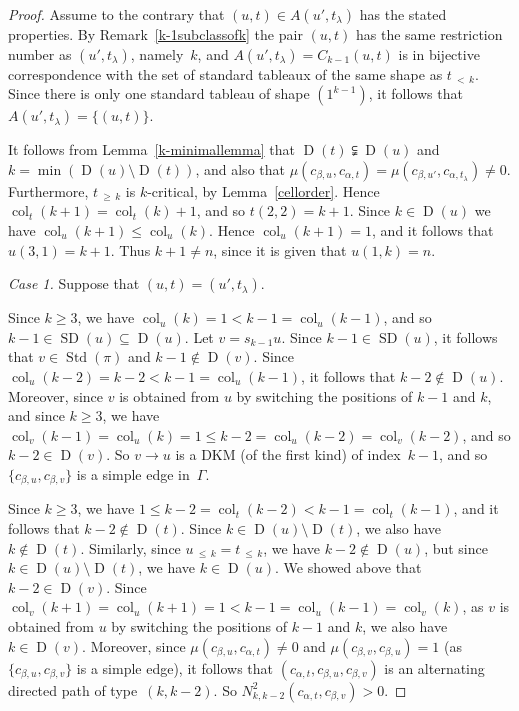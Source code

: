 \documentclass[10pt]{amsart}
\theoremstyle{definition}
\newenvironment{Case}[1]{\smallskip\noindent\emph{Case #1}\endgraf
 \nobreak\noindent\ignorespaces}{\endgraf\smallskip}
\DeclareMathOperator{\col}{col}
\newcommand{\lessthan}[2]{#1\,{_{<\,#2}}}
\newcommand{\Lessthan}[2]{#1\,{_{\leqslant\,#2}}}
\newcommand{\Morethan}[2]{#1\,{_{\geqslant\,#2}}}
\DeclareMathOperator{\STD}{Std}
\DeclareMathOperator{\SD}{SD}
\DeclareMathOperator{\D}{D}
\begin{document}
\begin{proof}
Assume to the contrary that $(u,t)\in A(u',t_\lambda)$ has the stated properties.
By Remark~\ref{k-1subclassofk} the pair $(u,t)$ has the same restriction number
as $(u',t_\lambda)$, namely~$k$, and $A(u',t_\lambda)=C_{k-1}(u,t)$ is in bijective
correspondence with the set of standard tableaux of the same shape as $\lessthan tk$.
Since there is only one standard tableau of shape $(1^{k-1})$, it follows that
$A(u',t_\lambda)=\{(u,t)\}$.

It follows from Lemma~\ref{k-minimallemma} that $\D(t)\subsetneqq\D(u)$ and
$k=\min(\D(u)\setminus\D(t))$, and also that
$\mu(c_{\beta,u},c_{\alpha,t})=\mu(c_{\beta,u'},c_{\alpha,t_\lambda})\neq 0$. Furthermore,
$\Morethan tk$ is $k$-critical, by Lemma~\ref{cellorder}.
Hence $\col_t(k+1)=\col_t(k)+1$, and so $t(2,2)=k+1$. Since
$k\in\D(u)$ we have $\col_u(k+1)\leqslant\col_u(k)$. Hence $\col_u(k+1)=1$,
and it follows that $u(3,1)=k+1$. Thus $k+1\ne n$, since it is given that
$u(1,k)=n$.

\begin{Case}{1.} Suppose that $(u,t)=(u',t_\lambda)$.

Since $k\geqslant 3$, we have
$\col_u(k)=1<k-1=\col_u(k-1)$, and so
$k-1\in\SD(u)\subseteq\D(u)$. Let $v=s_{k-1}u$. Since
$k-1\in\SD(u)$, it follows that
$v\in\STD(\pi)$ and $k-1\notin\D(v)$.
Since $\col_u(k-2)=k-2<k-1=\col_u(k-1)$, it follows that
$k-2\notin\D(u)$. Moreover,
since $v$ is obtained from $u$ by switching the positions of $k-1$ and $k$,
and since $k\geqslant 3$, we have
$\col_v(k-1)=\col_u(k)=1\leqslant k-2=\col_u(k-2)=\col_v(k-2)$,
and so $k-2\in\D(v)$. So $v\to u$ is a DKM
(of the first kind) of index~$k-1$, and so
$\{c_{\beta,u},c_{\beta,v}\}$ is a simple edge in~$\Gamma$.

Since $k\geqslant 3$, we have $1\leqslant k-2=\col_t(k-2)<k-1=\col_t(k-1)$,
and it follows that $k-2\notin\D(t)$. Since $k\in\D(u)\setminus\D(t)$, we
also have $k\notin\D(t)$. Similarly, since $\Lessthan uk = \Lessthan tk$,
we have $k-2\notin\D(u)$, but since
$k\in\D(u)\setminus\D(t)$, we have $k\in\D(u)$.
We showed above that $k-2\in\D(v)$. Since
$\col_v(k+1)=\col_u(k+1)=1<k-1=\col_u(k-1)=\col_v(k)$, as
$v$ is obtained from $u$ by switching the positions of $k-1$ and $k$,
we also have $k\in\D(v)$.
Moreover, since $\mu(c_{\beta,u},c_{\alpha,t})\neq 0$ and
$\mu(c_{\beta,v},c_{\beta,u})=1$ (as
$\{c_{\beta,u},c_{\beta,v}\}$ is a simple edge),
it follows that $(c_{\alpha,t},c_{\beta,u},c_{\beta,v})$ is
an alternating directed path of type~$(k,k-2)$.
So $N^{2}_{k,k-2}(c_{\alpha,t},c_{\beta,v})>0$.


\end{Case}
\end{proof}
\end{document}
